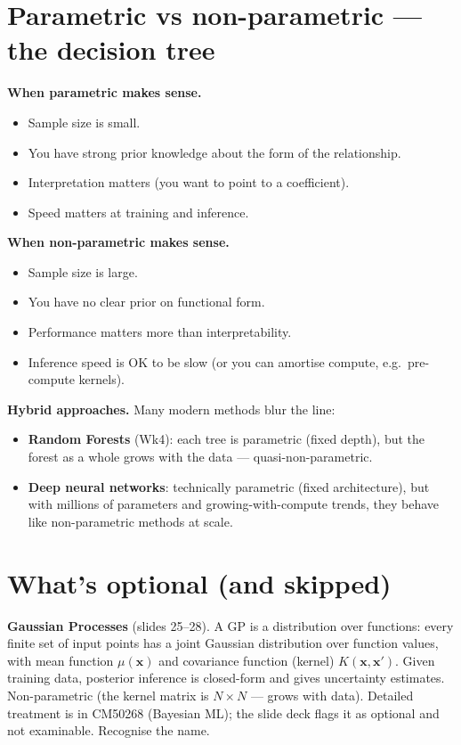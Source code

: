 \documentclass[11pt, a4paper]{article}
\begin{document}
\section{Parametric vs non-parametric — the decision tree}

\textbf{When parametric makes sense.}
\begin{itemize}
  \item Sample size is small.
  \item You have strong prior knowledge about the form of the relationship.
  \item Interpretation matters (you want to point to a coefficient).
  \item Speed matters at training and inference.
\end{itemize}

\textbf{When non-parametric makes sense.}
\begin{itemize}
  \item Sample size is large.
  \item You have no clear prior on functional form.
  \item Performance matters more than interpretability.
  \item Inference speed is OK to be slow (or you can amortise compute, e.g.\ pre-compute kernels).
\end{itemize}

\textbf{Hybrid approaches.} Many modern methods blur the line:
\begin{itemize}
  \item \textbf{Random Forests} (Wk4): each tree is parametric (fixed depth), but the forest as a whole grows with the data — quasi-non-parametric.
  \item \textbf{Deep neural networks}: technically parametric (fixed architecture), but with millions of parameters and growing-with-compute trends, they behave like non-parametric methods at scale.
\end{itemize}

\section{What's optional (and skipped)}

\textbf{Gaussian Processes} (slides 25--28). A GP is a distribution over functions: every finite set of input points has a joint Gaussian distribution over function values, with mean function $\mu(\mathbf{x})$ and covariance function (kernel) $K(\mathbf{x},\mathbf{x}')$. Given training data, posterior inference is closed-form and gives uncertainty estimates. Non-parametric (the kernel matrix is $N\times N$ — grows with data). Detailed treatment is in CM50268 (Bayesian ML); the slide deck flags it as optional and not examinable. Recognise the name.
\end{document}
